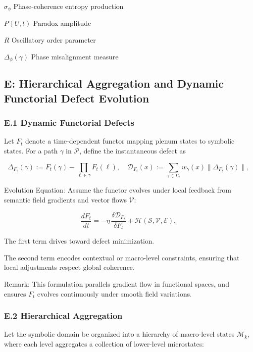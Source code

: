 \documentclass[12pt]{article}
\theoremstyle{plain}
\begin{document}
\(\sigma_\phi\)	Phase-coherence entropy production

\(P(U,t)\)	Paradox amplitude

\(R\)	Oscillatory order parameter

\(\Delta_\phi(\gamma)\)	Phase misalignment measure

\subsection*{E: Hierarchical Aggregation and Dynamic Functorial Defect Evolution}

\subsubsection*{E.1 Dynamic Functorial Defects}

Let \(F_t\) denote a time-dependent functor mapping plenum states to symbolic states. For a path \(\gamma\) in \(\mathcal{P}\), define the instantaneous defect as

\begin{equation}
\Delta_{F_t}(\gamma) := F_t(\gamma) - \prod_{\ell \in \gamma} F_t(\ell), \quad \mathcal{D}_{F_t}(x) := \sum_{\gamma \in \Gamma_x} w_\gamma(x) \|\Delta_{F_t}(\gamma)\|,
\end{equation}

Evolution Equation: Assume the functor evolves under local feedback from semantic field gradients and vector flows \(\mathcal{V}\):

\begin{equation}
\frac{d F_t}{dt} = - \eta \, \frac{\delta \mathcal{D}_{F_t}}{\delta F_t} + \mathcal{H}(\mathcal{S}, \mathcal{V}, \mathcal{E}),
\end{equation}

The first term drives toward defect minimization.

The second term encodes contextual or macro-level constraints, ensuring that local adjustments respect global coherence.

Remark: This formulation parallels gradient flow in functional spaces, and ensures \(F_t\) evolves continuously under smooth field variations.

\subsubsection*{E.2 Hierarchical Aggregation}

Let the symbolic domain be organized into a hierarchy of macro-level states \(\mathcal{M}_k\), where each level aggregates a collection of lower-level microstates:
\end{document}
